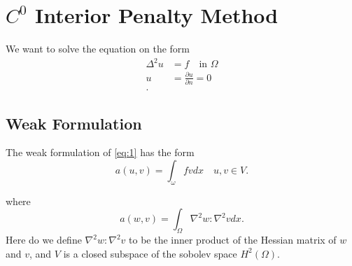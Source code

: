 \section{$C^0$ Interior Penalty Method}\label{sec:ch1}


We want to solve the equation on the form
\begin{align}
    \label{eq:1}
    \Delta ^{2} u &= f \quad \text{in } \Omega  \\
    u &= \frac{\partial u}{\partial n} = 0  \\
.\end{align}

\subsection{Weak Formulation}%
\label{sub:weak_formulation}


The weak formulation of \eqref{eq:1} has the form
\begin{equation}
\label{eq:2}
    a\left( u,v \right) = \int_{\omega}^{} f v dx \quad u,v \in V
.\end{equation}

where
\begin{equation}
\label{eq:3}
    a\left( w,v \right) = \int_{\Omega }^{} \nabla ^2 w : \nabla ^2 v dx
.\end{equation}
Here do we define $\nabla ^2 w : \nabla ^2 v $ to be the inner product of the Hessian matrix of $w$  and $v$, and $V$
is a closed subspace of the sobolev space $H^2\left( \Omega  \right)$.






